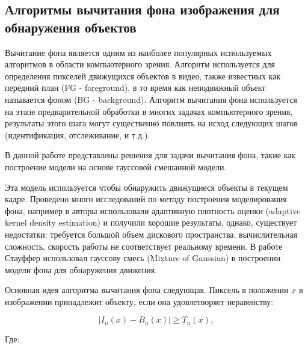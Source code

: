 \subsection{Алгоритмы вычитания фона изображения для обнаружения объектов} \label{part2.2.2}
Вычитание фона является одним из наиболее популярных используемых алгоритмов в области компьютерного зрения. Алгоритм используется для определения пикселей движущихся объектов в видео, также известных как передний план (FG - foreground), в то время как неподвижный объект называется фоном (BG - background). Алгоритм вычитания фона используется на этапе предварительной обработки в многих задачах компьютерного зрения, результаты этого шага могут существенно повлиять на исход следующих шагов (идентификация, отслеживание, и т.д.).

В данной работе представлены решения для задачи вычитания фона, такие как построение модели на основе гауссовой смешанной модели.

Эта модель используется чтобы обнаружить движущиеся объекты в текущем кадре. Проведено много исследований по методу построения моделирования фона, например в \cite{Mittal2004} авторы использовали адаптивную плотность оценки (adaptive kernel density estimation) и получили хорошие результаты, однако, существует недостатки: требуется большой объем дискового пространства, вычислительная сложность, скорость работы не соответствует реальному времени. В работе \cite{Stauffer2009} Стауффер использовал гауссову смесь (Mixture of Gaussian) в построении модели фона для обнаружения движения. 

Основная идея алгоритма вычитания фона следующая. Пиксель в положении $x$ в изображении принадлежит объекту, если она удовлетворяет неравенству:

	\begin{equation}\label{eq8}
\left|I_n\left(x\right)-B_n\left(x\right)\right| \geq T_n\left(x\right),
\end{equation}

Где:

